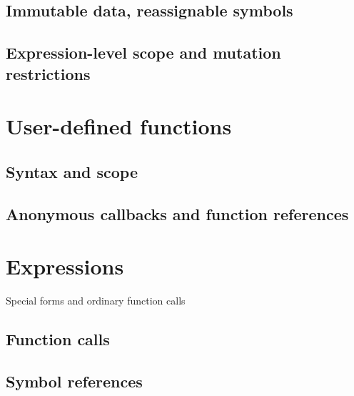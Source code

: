 \documentclass{article}
\theoremstyle{definition}
\begin{document}
\subsection{Immutable data, reassignable symbols}

\subsection{Expression-level scope and mutation restrictions}

\pagebreak

\section{User-defined functions}

\hypertarget{hsec:fcndef}{}
\label{form:fcndef}


\hypertarget{hsec:fcnref}{}
\label{form:fcnref}


\subsection{Syntax and scope}

\subsection{Anonymous callbacks and function references}

\pagebreak

\hypertarget{hsec:expressions}{}
\section{Expressions}
\label{sec:expressions}

Special forms and ordinary function calls

\hypertarget{hsec:function-call}{}
\subsection{Function calls}
\label{sec:function-call}

\hypertarget{hsec:symbol-ref}{}
\subsection{Symbol references}
\label{sec:symbol-ref}
\end{document}
